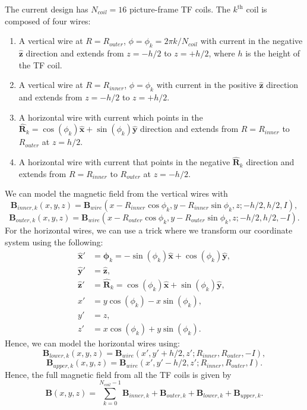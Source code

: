 \documentclass{article}
\begin{document}
The current design has $N_{coil}=16$ picture-frame TF coils. The $k^{\text{th}}$ coil is composed of four wires:
\begin{enumerate}
    \item A vertical wire at $R=R_{outer}$, $\phi=\phi_k=2\pi k/N_{coil}$ with current in the negative $\mathbf{\hat{z}}$ direction and extends from $z=-h/2$ to $z=+h/2$, where $h$ is the height of the TF coil.
    \item  A vertical wire at $R=R_{inner}$, $\phi=\phi_k$ with current in the positive $\mathbf{\hat{z}}$ direction and extends from $z=-h/2$ to $z=+h/2$.
    \item A horizontal wire with current which points in the $\mathbf{\hat{R}}_k = \cos(\phi_k)\mathbf{\hat{x}}+\sin(\phi_k)\mathbf{\hat{y}}$ direction and extends from $R=R_{inner}$ to $R_{outer}$ at $z=h/2$.
    \item A horizontal wire with current that points in the negative $\mathbf{\hat{R}}_k$ direction and extends from $R=R_{inner}$ to $R_{outer}$ at $z=-h/2$.
\end{enumerate}
We can model the magnetic field from the vertical wires with 
\[\mathbf{B}_{inner,k}(x,y,z) = \mathbf{B}_{wire}(x-R_{inner}\cos\phi_k, y-R_{inner}\sin{\phi_k}, z; -h/2, h/2, I),\]
\[\mathbf{B}_{outer,k}(x,y,z) = \mathbf{B}_{wire}(x-R_{outer}\cos\phi_k, y-R_{outer}\sin{\phi_k}, z; -h/2, h/2, -I).\]
For the horizontal wires, we can use a trick where we transform our coordinate system using the following:
\[\begin{aligned}
\mathbf{\hat{x}}' &= \mathbf{\hat{\phi}}_k = -\sin(\phi_k)\mathbf{\hat{x}}+\cos(\phi_k)\mathbf{\hat{y}}, \\
\mathbf{\hat{y}}' &= \mathbf{\hat{z}}, \\
\mathbf{\hat{z}}' &= \mathbf{\hat{R}}_k=\cos(\phi_k)\mathbf{\hat{x}} + \sin(\phi_k)\mathbf{\hat{y}}, \\
x' &= y\cos(\phi_k) - x\sin(\phi_k), \\
y' &= z, \\
z' &= x\cos(\phi_k) + y\sin(\phi_k).
\end{aligned}\]
Hence, we can model the horizontal wires using:
\[\mathbf{B}_{lower,k}(x,y,z) = \mathbf{B}_{wire}(x', y'+h/2, z'; R_{inner}, R_{outer}, -I),\]
\[\mathbf{B}_{upper,k}(x,y,z) = \mathbf{B}_{wire}(x', y'-h/2, z'; R_{inner}, R_{outer}, I).\]
Hence, the full magnetic field from all the TF coils is given by
\[\boxed{\mathbf{B}(x, y, z) = \sum_{k=0}^{N_{coil}-1}\mathbf{B}_{inner,k} + \mathbf{B}_{outer,k} + \mathbf{B}_{lower,k} + \mathbf{B}_{upper,k}.}\]
\end{document}
